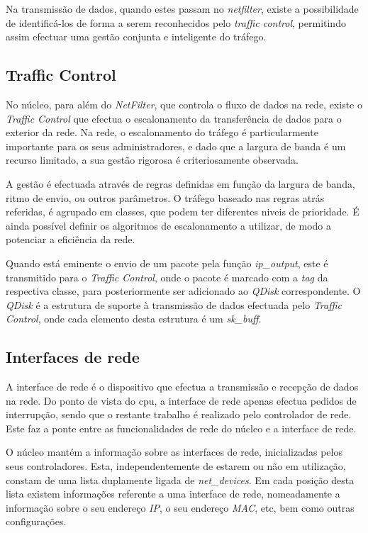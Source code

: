 Na transmissão de dados, quando estes passam no \textit{netfilter}, existe a possibilidade de identificá-los de forma a serem reconhecidos pelo \textit{traffic control}, permitindo assim efectuar uma gestão conjunta e inteligente do tráfego.

\subsection{Traffic Control}
\label{sub:traffic_control}


No núcleo, para além do \textit{NetFilter}, que controla o fluxo de dados na rede, existe o \textit{Traffic Control} que efectua o escalonamento da transferência de dados para o exterior da rede.
Na rede, o escalonamento do tráfego é particularmente importante para os seus administradores, e dado que a largura de banda é um recurso limitado, a sua gestão rigorosa é criteriosamente observada.

A gestão é efectuada através de regras definidas em função da largura de banda, ritmo de envio, ou outros parâmetros.
O tráfego baseado nas regras atrás referidas, é agrupado em classes, que podem ter diferentes niveis de prioridade.
É ainda possível definir os algoritmos de escalonamento a utilizar, de modo a potenciar a eficiência da rede.

Quando está eminente o envio de um pacote pela função \textit{ip\_output}, este é transmitido para o \textit{Traffic Control}, onde o pacote é marcado com a \textit{tag} da respectiva classe, para posteriormente ser adicionado ao \textit{QDisk} correspondente.
O \textit{QDisk} é a estrutura de suporte à transmissão de dados efectuada pelo \textit{Traffic Control}, onde cada elemento desta estrutura é um \textit{sk\_buff}.


\subsection{Interfaces de rede}

A interface de rede é o dispositivo que efectua a transmissão e recepção de dados na rede.
Do ponto de vista do cpu, a interface de rede apenas efectua pedidos de interrupção, sendo que o restante trabalho é realizado pelo controlador de rede.
Este faz a ponte entre as funcionalidades de rede do núcleo e a interface de rede.

O núcleo mantém a informação sobre as interfaces de rede, inicializadas pelos seus controladores.
Esta, independentemente de estarem ou não em utilização, constam de uma lista duplamente ligada de \textit{net\_devices}.
Em cada posição desta lista existem informações referente a uma interface de rede, nomeadamente a informação sobre o seu endereço \textit{IP}, o seu endereço \textit{MAC}, etc, bem como outras configurações.

